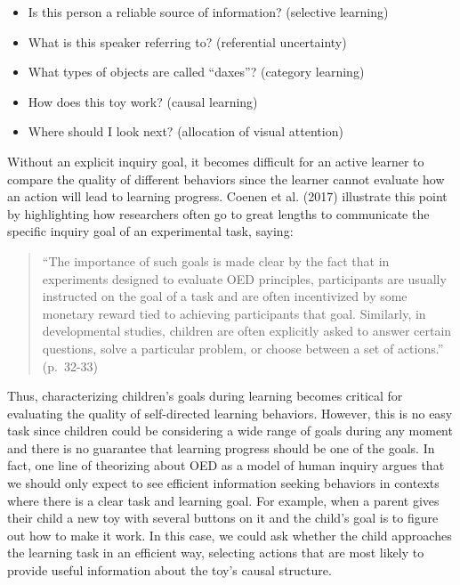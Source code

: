 \documentclass[english,man]{apa6}
\providecommand{\tightlist}{%
  \setlength{\itemsep}{0pt}\setlength{\parskip}{0pt}}
\theoremstyle{definition}
\theoremstyle{definition}
\theoremstyle{definition}
\theoremstyle{remark}
\begin{document}
\begin{itemize}
\tightlist
\item
  Is this person a reliable source of information? (selective learning)
\item
  What is this speaker referring to? (referential uncertainty)
\item
  What types of objects are called \enquote{daxes}? (category learning)
\item
  How does this toy work? (causal learning)
\item
  Where should I look next? (allocation of visual attention)
\end{itemize}

Without an explicit inquiry goal, it becomes difficult for an active
learner to compare the quality of different behaviors since the learner
cannot evaluate how an action will lead to learning progress. Coenen et
al. (2017) illustrate this point by highlighting how researchers often
go to great lengths to communicate the specific inquiry goal of an
experimental task, saying:

\begin{quote}
\enquote{The importance of such goals is made clear by the fact that in
experiments designed to evaluate OED principles, participants are
usually instructed on the goal of a task and are often incentivized by
some monetary reward tied to achieving participants that goal.
Similarly, in developmental studies, children are often explicitly asked
to answer certain questions, solve a particular problem, or choose
between a set of actions.} (p.~32-33)
\end{quote}

Thus, characterizing children's goals during learning becomes critical
for evaluating the quality of self-directed learning behaviors. However,
this is no easy task since children could be considering a wide range of
goals during any moment and there is no guarantee that learning progress
should be one of the goals. In fact, one line of theorizing about OED as
a model of human inquiry argues that we should only expect to see
efficient information seeking behaviors in contexts where there is a
clear task and learning goal. For example, when a parent gives their
child a new toy with several buttons on it and the child's goal is to
figure out how to make it work. In this case, we could ask whether the
child approaches the learning task in an efficient way, selecting
actions that are most likely to provide useful information about the
toy's causal structure.
\end{document}
